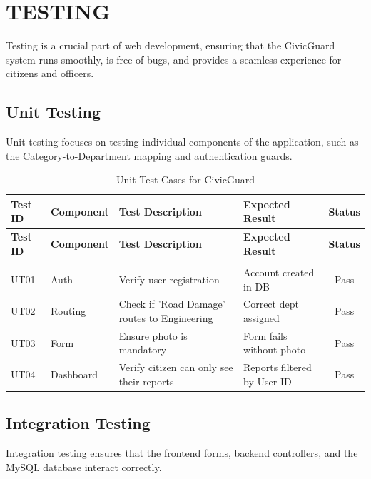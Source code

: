 \chapter{TESTING}
Testing is a crucial part of web development, ensuring that the CivicGuard system runs smoothly, is free of bugs, and provides a seamless experience for citizens and officers. 

\section{Unit Testing}
Unit testing focuses on testing individual components of the application, such as the Category-to-Department mapping and authentication guards.

\begin{longtable}{|p{1.5cm}|p{2.5cm}|p{4cm}|p{4cm}|c|}
    \hline
    \textbf{Test ID} & \textbf{Component} & \textbf{Test Description} & \textbf{Expected Result} & \textbf{Status} \\
    \hline
    \endfirsthead
    \hline
    \textbf{Test ID} & \textbf{Component} & \textbf{Test Description} & \textbf{Expected Result} & \textbf{Status} \\
    \hline
    \endhead
    \hline
    \caption{Unit Test Cases for CivicGuard} \label{tab:unit_tests} \\
    \endlastfoot

    UT01 & Auth & Verify user registration & Account created in DB & Pass \\
    \hline
    UT02 & Routing & Check if 'Road Damage' routes to Engineering & Correct dept assigned & Pass \\
    \hline
    UT03 & Form & Ensure photo is mandatory & Form fails without photo & Pass \\
    \hline
    UT04 & Dashboard & Verify citizen can only see their reports & Reports filtered by User ID & Pass \\
    \hline
\end{longtable}

\section{Integration Testing}
Integration testing ensures that the frontend forms, backend controllers, and the MySQL database interact correctly.


